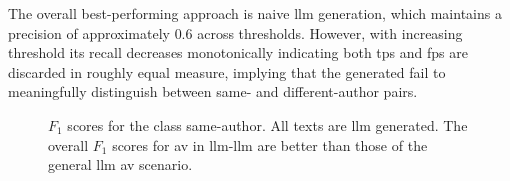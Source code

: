 The overall best-performing approach is naive \ac{llm} generation, which maintains a precision of approximately $0.6$ across thresholds.  
However, with increasing threshold its recall decreases monotonically indicating both \acp{tp} and \acp{fp} are discarded in roughly equal measure, implying that the generated \imps{} fail to meaningfully distinguish between same- and different-author pairs.


  \begin{figure}[h]
    \centering
    
    \caption[\ac{llm}-\ac{llm} \ac{av} $F_1$ scores.]{$F_1$ scores for the class same-author.
  All texts are \ac{llm} generated.
  The overall $F_1$ scores for \ac{av} in \ac{llm}-\ac{llm} are better than those of the general \ac{llm} \ac{av} scenario.
  }
    \label{fig:llm-llm_f1}
  \end{figure}

